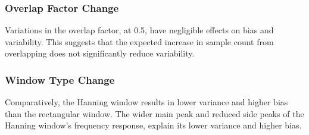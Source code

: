 \documentclass[8pt]{article}  %
\theoremstyle{plain}
\theoremstyle{definition}
\theoremstyle{remark}
\begin{document}
    \subsubsection{Overlap Factor Change}
    Variations in the overlap factor, 
    at 0.5, 
    have negligible effects on bias and variability. 
    This suggests that the expected increase in sample count from overlapping does not significantly reduce variability.

    \subsubsection{Window Type Change}
    Comparatively, 
    the Hanning window results in 
    lower variance 
    and higher bias than the rectangular window. 
    The wider main peak and reduced side peaks of the Hanning window's frequency response, 
    explain its lower variance and higher bias.
    
\end{document}
